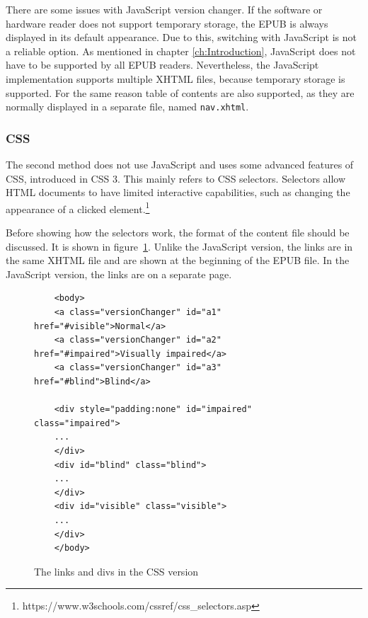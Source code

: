 There are some issues with JavaScript version changer. If the software or hardware reader does not support temporary storage, the EPUB is always displayed in its default appearance. Due to this, switching with JavaScript is not a reliable option. As mentioned in chapter \ref{ch:Introduction}, JavaScript does not have to be supported by all EPUB readers. Nevertheless, the JavaScript implementation supports multiple XHTML files, because temporary storage is supported. For the same reason table of contents are also supported, as they are normally displayed in a separate file, named \lstinline|nav.xhtml|. 

\subsubsection{CSS}
The second method does not use JavaScript and uses some advanced features of CSS, introduced in CSS 3. This mainly refers to CSS selectors. Selectors allow HTML documents to have limited interactive capabilities, such as changing the appearance of a clicked element.\cite{cssSelectors}\footnote{https://www.w3schools.com/cssref/css\_selectors.asp} 

Before showing how the selectors work, the format of the content file should be discussed. It is shown in figure~\ref{fig:css_switch}. Unlike the JavaScript version, the links are in the same XHTML file and are shown at the beginning of the EPUB file. In the JavaScript version, the links are on a separate page.


\begin{figure}
	
	\begin{lstlisting}
	<body>
	<a class="versionChanger" id="a1" href="#visible">Normal</a>
	<a class="versionChanger" id="a2" href="#impaired">Visually impaired</a>
	<a class="versionChanger" id="a3" href="#blind">Blind</a>
	
	<div style="padding:none" id="impaired" class="impaired">
	...
	</div>
	<div id="blind" class="blind">
	...
	</div>
	<div id="visible" class="visible">
	...
	</div>
	</body>
	\end{lstlisting}
	\caption{The links and divs in the CSS version}
	\label{fig:css_switch}
\end{figure}

